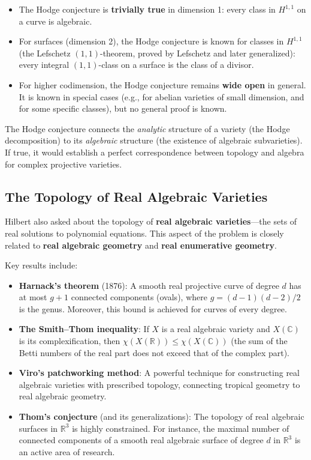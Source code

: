 \begin{itemize}
    \item The Hodge conjecture is \textbf{trivially true} in dimension 1: every class in $H^{1,1}$ on a curve is algebraic.
    \item For surfaces (dimension 2), the Hodge conjecture is known for classes in $H^{1,1}$ (the Lefschetz $(1,1)$-theorem, proved by Lefschetz and later generalized): every integral $(1,1)$-class on a surface is the class of a divisor.
    \item For higher codimension, the Hodge conjecture remains \textbf{wide open} in general. It is known in special cases (e.g., for abelian varieties of small dimension, and for some specific classes), but no general proof is known.
\end{itemize}

The Hodge conjecture connects the \emph{analytic} structure of a variety (the Hodge decomposition) to its \emph{algebraic} structure (the existence of algebraic subvarieties). If true, it would establish a perfect correspondence between topology and algebra for complex projective varieties.

\subsection{The Topology of Real Algebraic Varieties}

Hilbert also asked about the topology of \textbf{real algebraic varieties}---the sets of real solutions to polynomial equations. This aspect of the problem is closely related to \textbf{real algebraic geometry} and \textbf{real enumerative geometry}.

Key results include:

\begin{itemize}
    \item \textbf{Harnack's theorem} (1876): A smooth real projective curve of degree $d$ has at most $g + 1$ connected components (ovals), where $g = (d-1)(d-2)/2$ is the genus. Moreover, this bound is achieved for curves of every degree.

    \item \textbf{The Smith--Thom inequality}: If $X$ is a real algebraic variety and $X(\mathbb{C})$ is its complexification, then $\chi(X(\mathbb{R})) \leq \chi(X(\mathbb{C}))$ (the sum of the Betti numbers of the real part does not exceed that of the complex part).

    \item \textbf{Viro's patchworking method}: A powerful technique for constructing real algebraic varieties with prescribed topology, connecting tropical geometry to real algebraic geometry.

    \item \textbf{Thom's conjecture} (and its generalizations): The topology of real algebraic surfaces in $\mathbb{R}^3$ is highly constrained. For instance, the maximal number of connected components of a smooth real algebraic surface of degree $d$ in $\mathbb{R}^3$ is an active area of research.
\end{itemize}

